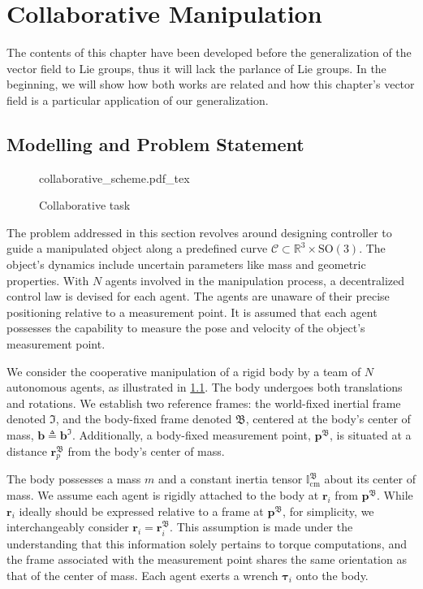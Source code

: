 \chapter{Collaborative Manipulation}\label{ch:collaborative}
The contents of this chapter have been developed before the generalization of the vector field to Lie groups, thus it will lack the parlance of Lie groups. In the beginning, we will show how both works are related and how this chapter's vector field is a particular application of our generalization.
\section{Modelling and Problem Statement}
\begin{figure}[ht]
    \centering
    \def\svgwidth{.8\linewidth}
    {collaborative_scheme.pdf_tex}
    \caption{Collaborative task}
    \label{fig:problem}
\end{figure}
The problem addressed in this section revolves around designing controller to guide a manipulated object along a predefined curve $\mathcal{C} \subset \mathbb{R}^3\times \text{SO}(3)$. The object's dynamics include uncertain parameters like mass and geometric properties. With $N$ agents involved in the manipulation process, a decentralized control law is devised for each agent. The agents are unaware of their precise positioning relative to a measurement point. It is assumed that each agent possesses the capability to measure the pose and velocity of the object's measurement point.

We consider the cooperative manipulation of a rigid body by a team of $N$ autonomous agents, as illustrated in \cref{fig:problem}. The body undergoes both translations and rotations. We establish two reference frames: the world-fixed inertial frame denoted $\mathfrak{I}$, and the body-fixed frame denoted $\mathfrak{B}$, centered at the body's center of mass, $\mathbf{b}\triangleq\mathbf{b}^\mathfrak{I}$. Additionally, a body-fixed measurement point, $\mathbf{p}^\mathfrak{B}$, is situated at a distance $\mathbf{r}_p^\mathfrak{B}$ from the body's center of mass.

The body possesses a mass $m$ and a constant inertia tensor $\mathbb{I}_\text{cm}^\mathfrak{B}$ about its center of mass. We assume each agent is rigidly attached to the body at $\mathbf{r}_i$ from $\mathbf{p}^\mathfrak{B}$. While $\mathbf{r}_i$ ideally should be expressed relative to a frame at $\mathbf{p}^\mathfrak{B}$, for simplicity, we interchangeably consider $\mathbf{r}_i= \mathbf{r}_i^\mathfrak{B}$. This assumption is made under the understanding that this information solely pertains to torque computations, and the frame associated with the measurement point shares the same orientation as that of the center of mass. Each agent exerts a wrench $\boldsymbol{\tau}_i$ onto the body.


